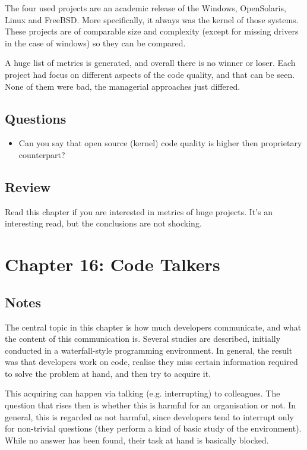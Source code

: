 The four used projects are an academic release of the Windows, OpenSolaris, Linux and FreeBSD.
More specifically, it always was the kernel of  those systems. 
These projects are of comparable size and complexity (except for missing drivers in the case of windows) so they can be compared. 

A huge list of metrics is generated, and overall there is no winner or loser. 
Each project had focus on different aspects of the code quality, and that can be seen. 
None of them were bad, the managerial approaches just differed. 

\subsection{Questions}
\begin{itemize}
  \item Can you say that open source (kernel) code quality is higher then proprietary counterpart?
\end{itemize}

\subsection{Review}
Read this chapter if you are interested in metrics of huge projects.
It's an interesting read, but the conclusions are not shocking.

\section{Chapter 16: Code Talkers}
\subsection{Notes}
The central topic in this chapter is how much developers communicate, and what the content of this communication is. 
Several studies are described, initially conducted in a waterfall-style programming environment. 
In general, the result was that developers work on code, realise they miss certain information required to solve the problem at hand, and then try to acquire it. 

This acquiring can happen via talking (e.g. interrupting) to colleagues.
The question that rises then is whether this is harmful for an organisation or not. 
In general, this is regarded as not harmful, since developers tend to interrupt only for non-trivial questions (they perform a kind of basic study of the environment).
While no answer has been found, their task at hand is basically blocked. 

